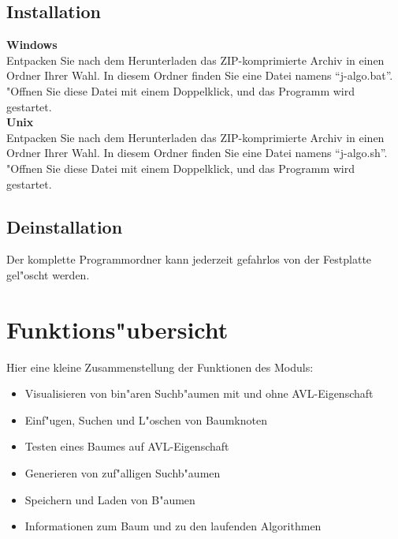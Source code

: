 \medskip
\subsection{Installation}

{\bf Windows} \\
Entpacken Sie nach dem Herunterladen das ZIP-komprimierte Archiv in einen Ordner Ihrer Wahl. 
In diesem Ordner finden Sie eine Datei namens "`j-algo.bat"'. 
"Offnen Sie diese Datei mit einem Doppelklick, und das Programm wird gestartet. \\

{\bf Unix}  \\
Entpacken Sie nach dem Herunterladen das ZIP-komprimierte Archiv in einen Ordner Ihrer Wahl. 
In diesem Ordner finden Sie eine Datei namens "`j-algo.sh"'. 
"Offnen Sie diese Datei mit einem Doppelklick, und das Programm wird gestartet.


\medskip
\subsection{Deinstallation}
Der komplette Programmordner kann jederzeit gefahrlos von der Festplatte gel"oscht werden.


\bigskip

\section{Funktions"ubersicht}

Hier eine kleine Zusammenstellung der Funktionen des Moduls:
\begin{itemize}
\item Visualisieren von bin"aren Suchb"aumen mit und ohne AVL-Eigenschaft
\item Einf"ugen, Suchen und L"oschen von Baumknoten 
\item Testen eines Baumes auf AVL-Eigenschaft
\item Generieren von zuf"alligen Suchb"aumen
\item Speichern und Laden von B"aumen
\item Informationen zum Baum und zu den laufenden Algorithmen

\end{itemize}

\bigskip
\bigskip
